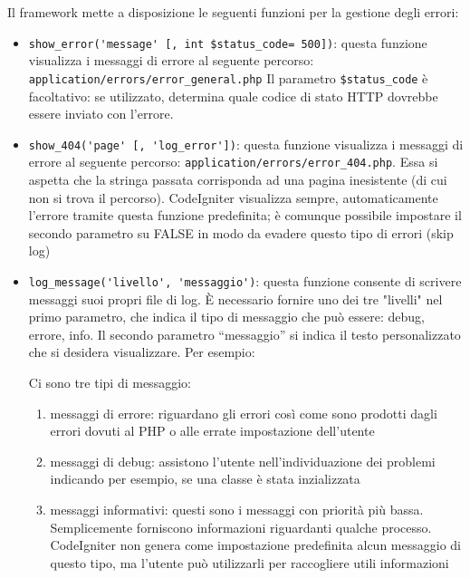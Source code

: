 Il framework mette a disposizione le seguenti funzioni per la gestione degli errori:

\begin{itemize}
\item \verb|show_error('message' [, int $status_code= 500])|: questa funzione visualizza i messaggi di errore al seguente percorso: \verb|application/errors/error_general.php| Il parametro \verb|$status_code| è facoltativo: se utilizzato, determina quale codice di stato HTTP dovrebbe essere inviato con l'errore.

\item \verb|show_404('page' [, 'log_error'])|: questa funzione visualizza i messaggi di errore al seguente percorso: \verb|application/errors/error_404.php|. Essa si aspetta che la stringa passata corrisponda ad una pagina inesistente (di cui non si trova il percorso). CodeIgniter visualizza sempre, automaticamente l'errore tramite questa funzione predefinita; è comunque possibile impostare il secondo parametro su FALSE in modo da evadere questo tipo di errori (skip log)

\item \verb|log_message('livello', 'messaggio')|: questa funzione consente di scrivere messaggi suoi propri file di log. È necessario fornire uno dei tre "livelli" nel primo parametro, che indica il tipo di messaggio che può essere: debug, errore, info. Il secondo parametro ``messaggio'' si indica il testo personalizzato che si desidera visualizzare. Per esempio:


Ci sono tre tipi di messaggio:
\begin{enumerate}
\item messaggi di errore: riguardano gli errori così come sono prodotti dagli errori dovuti al PHP o alle errate impostazione dell'utente
\item messaggi di debug: assistono l'utente nell'individuazione dei problemi indicando per esempio, se una classe è stata inzializzata
\item messaggi informativi: questi sono i messaggi con priorità più bassa. Semplicemente forniscono informazioni riguardanti qualche processo. CodeIgniter non genera come impostazione predefinita alcun messaggio di questo tipo, ma l'utente può utilizzarli per raccogliere utili informazioni
\end{enumerate}


\end{itemize}
